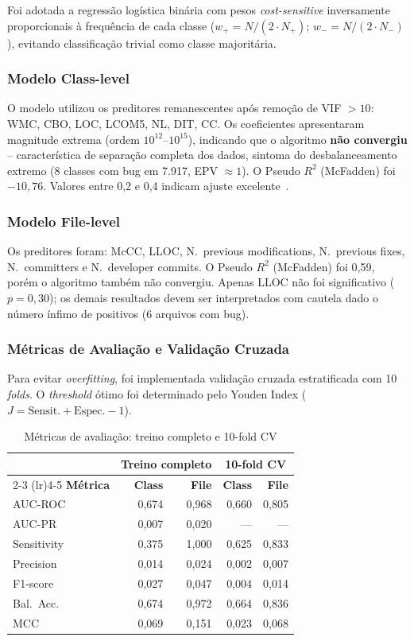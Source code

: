 \documentclass[conference]{IEEEtran}
\begin{document}
Foi adotada a regressão logística binária com pesos \textit{cost-sensitive} inversamente proporcionais à frequência de cada classe ($w_+ = N / (2 \cdot N_+)$; $w_- = N / (2 \cdot N_-)$), evitando classificação trivial como classe majoritária.

\subsubsection{Modelo Class-level}
O modelo utilizou os preditores remanescentes após remoção de VIF $> 10$: WMC, CBO, LOC, LCOM5, NL, DIT, CC. Os coeficientes apresentaram magnitude extrema (ordem $10^{12}$--$10^{15}$), indicando que o algoritmo \textbf{não convergiu} -- característica de separação completa dos dados, sintoma do desbalanceamento extremo (8 classes com bug em 7.917, EPV $\approx 1$). O Pseudo $R^2$ (McFadden) foi $-10{,}76$. Valores entre 0,2 e 0,4 indicam ajuste excelente~\cite{mcfadden1974}.

\subsubsection{Modelo File-level}
Os preditores foram: McCC, LLOC, N.\ previous modifications, N.\ previous fixes, N.\ committers e N.\ developer commits. O Pseudo $R^2$ (McFadden) foi 0,59, porém o algoritmo também não convergiu. Apenas LLOC não foi significativo ($p = 0{,}30$); os demais resultados devem ser interpretados com cautela dado o número ínfimo de positivos (6 arquivos com bug).

\subsubsection{Métricas de Avaliação e Validação Cruzada}
Para evitar \textit{overfitting}, foi implementada validação cruzada estratificada com 10 \textit{folds}. O \textit{threshold} ótimo foi determinado pelo Youden Index ($J = \text{Sensit.} + \text{Espec.} - 1$).

\begin{table}[htbp]
\caption{Métricas de avaliação: treino completo e 10-fold CV}
\label{tab:metricas_avaliacao}
\centering
\footnotesize
\begin{tabular}{lrrrr}
\toprule
 & \multicolumn{2}{c}{\textbf{Treino completo}} & \multicolumn{2}{c}{\textbf{10-fold CV}} \\
\cmidrule(lr){2-3} \cmidrule(lr){4-5}
\textbf{Métrica} & \textbf{Class} & \textbf{File} & \textbf{Class} & \textbf{File} \\
\midrule
AUC-ROC     & 0,674 & 0,968 & 0,660 & 0,805 \\
AUC-PR      & 0,007 & 0,020 & ---   & ---   \\
Sensitivity & 0,375 & 1,000 & 0,625 & 0,833 \\
Precision   & 0,014 & 0,024 & 0,002 & 0,007 \\
F1-score    & 0,027 & 0,047 & 0,004 & 0,014 \\
Bal.\ Acc.  & 0,674 & 0,972 & 0,664 & 0,836 \\
MCC         & 0,069 & 0,151 & 0,023 & 0,068 \\
\bottomrule
\end{tabular}
\end{table}
\end{document}
